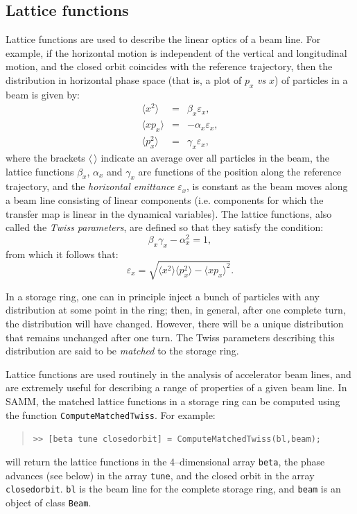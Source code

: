 \documentclass[11pt,twoside,a4paper]{article}
\begin{document}
\subsection{Lattice functions}
Lattice functions are used to describe the linear optics of a beam line.
For example, if the horizontal motion is independent of the vertical and
longitudinal motion, and the closed orbit coincides with the reference
trajectory, then the distribution in horizontal phase space (that is,
a plot of $p_x$ \emph{vs} $x$) of particles in a beam is given by:
\begin{eqnarray*}
\langle x^2 \rangle   & = &  \beta_x \varepsilon_x, \\
\langle xp_x \rangle  & = & -\alpha_x \varepsilon_x, \\
\langle p_x^2 \rangle & = &  \gamma_x \varepsilon_x,
\end{eqnarray*}
where the brackets $\langle\, \rangle$ indicate an average over all particles
in the beam, the lattice functions $\beta_x$, $\alpha_x$ and $\gamma_x$ are functions
of the position along the reference trajectory, and the \emph{horizontal
emittance} $\varepsilon_x$, is constant as the beam moves along a beam line
consisting of linear components (i.e. components for which the transfer map
is linear in the dynamical variables).  The lattice functions, also called the
\emph{Twiss parameters}, are defined so that they satisfy the condition:
\[
\beta_x \gamma_x - \alpha_x^2 = 1,
\]
from which it follows that:
\[
\varepsilon_x = \sqrt{\langle x^2 \rangle \langle p_x^2 \rangle - \langle xp_x \rangle^2}.
\]

In a storage ring, one can in principle inject a bunch of particles with any
distribution at some point in the ring; then, in general, after one complete turn,
the distribution will have changed.  However, there will be a unique distribution
that remains unchanged after one turn.  The Twiss parameters describing this
distribution are said to be \emph{matched} to the storage ring.

Lattice functions are used routinely in the analysis of accelerator beam
lines, and are extremely useful for describing a range of properties of a
given beam line.  In SAMM, the matched lattice functions in a storage ring can
be computed using the function \texttt{ComputeMatchedTwiss}.  For example:
\begin{quote}
\texttt{>> [beta tune closedorbit] = ComputeMatchedTwiss(bl,beam);}
\end{quote}
will return the lattice functions in the 4--dimensional array \texttt{beta}, the
phase advances (see below) in the array \texttt{tune}, and the closed
orbit in the array \texttt{closedorbit}.  \texttt{bl} is the beam line for the
complete storage ring, and \texttt{beam} is an object of class \texttt{Beam}.
\end{document}
